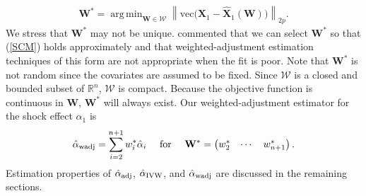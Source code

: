 \documentclass[11pt]{article}
\def\mbf#1{\mathbf{#1}} %
\def\mrm#1{\mathrm{#1}} %
\newcommand{\reals}{\mathbb{R}} %
\def\mc#1{\mathcal{#1}} %
\DeclareMathOperator*{\argmin}{arg\,min} %
\newcommand{\norm}[1]{\left\lVert#1\right\rVert} %
\theoremstyle{definition}
\begin{document}
\begin{align}
  \mbf{W}^* = \argmin_{\mbf{W}\in \mc{W}} \norm{\mrm{vec}\big(\mbf{X}_1-\hat{\mbf{X}}_1(\mbf{W})\big)}_{2p}. 
  \label{W}
\end{align}
We stress that $\mathbf{W}^*$ may not be unique. \cite{abadie2010synthetic} commented that we can select $\mbf{W}^*$ 
so that (\ref{SCM}) holds approximately %
and that weighted-adjustment estimation techniques of this form are not 
appropriate when the fit is poor. 
Note that $\mbf{W}^*$ is not random since the covariates are assumed to be fixed. Since $\mc{W}$ is a closed and bounded subset of $\reals^n$,  $\mc{W}$ is compact. Because the objective function 
is continuous in $\mbf{W}$, $\mbf{W}^*$ will always exist. %
Our weighted-adjustment estimator for the shock effect $\alpha_1$ is
  \begin{align*}
    \hat{\alpha}_{\rm wadj} = \sum_{i=2}^{n+1} w_i^*\hat{\alpha}_i
    \quad \text{ for } \quad \mbf{W}^* = \begin{pmatrix}
      w^*_2 & \cdots & w^*_{n+1}
    \end{pmatrix}.
  \end{align*}
Estimation properties of $\hat{\alpha}_{\rm adj}$, $\hat{\alpha}_{\rm IVW}$, 
and $\hat{\alpha}_{\rm wadj}$ are discussed in the remaining sections.
\end{document}

